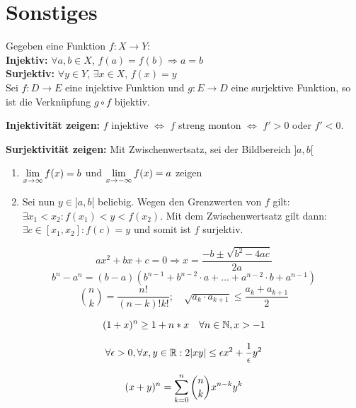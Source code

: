 \section{Sonstiges}



Gegeben eine Funktion $f : X \to Y$: \smallskip \\
\quad \textbf{Injektiv:} $\forall a,b \in X$, $f(a) = f(b) \Rightarrow a = b$ \\
\quad \textbf{Surjektiv:} $\forall y \in Y$, $\exists x \in X$, $f(x) = y$  \smallskip \\
Sei $f : D \to E$ eine injektive Funktion und $g : E \to D$ eine surjektive Funktion, so ist die
Verknüpfung $g \circ f$ bijektiv. \medskip

\textbf{Injektivität zeigen:} $f$ injektive $\Leftrightarrow$ $f$ streng monton $\Leftrightarrow$ $f' > 0$ 
oder $f' < 0$. \medskip

\textbf{Surjektivität zeigen:} Mit Zwischenwertsatz, sei der Bildbereich $]a,b[$
\begin{enumerate}[label = (\arabic*)]
        \item $\lim\limits_{x \to \infty} f(x) = b$ und $\lim\limits_{x \to - \infty} f(x) = a$ zeigen
        \item Sei nun $y \in ]a,b[$ beliebig. Wegen den Grenzwerten von $f$ gilt: $\exists x_1 < x_2
        : f(x_1) < y < f(x_2)$. Mit dem Zwischenwertsatz gilt dann: $\exists c \in [x_1, x_2] : f(c) = y$
        und somit ist $f$ surjektiv.
\end{enumerate}

$$ax^2 + bx + c = 0 \Rightarrow x = \frac{-b \pm \sqrt{b^2 - 4ac}}{2a}$$
$$b^n- a^n = (b-a)(b^{n-1}+b^{n-2}\cdot a + \dots + a^{n-2}\cdot b + a^{n-1})$$
$$\binom{n}{k} = \frac{n!}{(n-k)!k!}; \quad \sqrt{a_k\cdot a_{k+1}} \leq \frac{a_k + a_{k+1}}{2}$$

$$(1+x)^{n} \geq 1 + n*x \quad \forall n \in \mathbb{N}, x > -1$$

$$\forall \epsilon > 0, \forall x, y \in \mathbb{R}: 2 |xy| \leq \epsilon x^2 + \frac{1}{\epsilon} y^2$$

$$(x + y)^n = \sum\limits_{k = 0}^n \binom{n}{k} x^{n-k}y^k$$


\columnbreak



